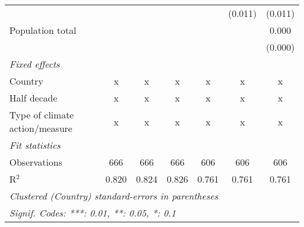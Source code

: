 \begin{tabular}{lcccccc}
                                                            &         &               &               &               & (0.011)       & (0.011)\\   
   Population total                                         &         &               &               &               &               & 0.000\\   
                                                            &         &               &               &               &               & (0.000)\\   
   \emph{Fixed effects}\\
   Country                                                  & x       & x             & x             & x             & x             & x\\  
   Half decade                                              & x       & x             & x             & x             & x             & x\\  
   Type of climate action/measure                           & x       & x             & x             & x             & x             & x\\  
   \midrule \emph{Fit statistics}\\
   Observations                                             & 666     & 666           & 666           & 606           & 606           & 606\\  
   R$^2$                                                    & 0.820   & 0.824         & 0.826         & 0.761         & 0.761         & 0.761\\  
   \midrule
   \multicolumn{7}{l}{\emph{Clustered (Country) standard-errors in parentheses}}\\
   \multicolumn{7}{l}{\emph{Signif. Codes: ***: 0.01, **: 0.05, *: 0.1}}\\
\end{tabular}
\par\endgroup


